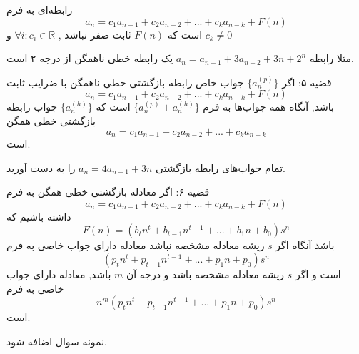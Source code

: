 \begin{DEFINITION}
    رابطه‌ای به فرم
   \[a_n=c_{1}a_{n-1}+c_{2}a_{n-2}+...+c_{k}a_{n-k}+F(n)\]
   است که
   $F(n)$
   ثابت صفر نباشد
   ,
   $\forall{i}:c_i \in \mathbb{R} $
   و 
   $ c_k\neq 0$

\end{DEFINITION}

مثلا رابطه‌ 
$a_n=a_{n-1}+3a_{n-2}+3n+2^n$
یک رابطه‌ خطی ناهمگن از درجه ۲ است.

\begin{THEOREM}
    قضیه ۵:
    اگر 
    $\{a^{(p)}_n\}$
    جواب خاص رابطه‌ بازگشتی خطی ناهمگن با ضرایب ثابت
    \[a_n=c_{1}a_{n-1}+c_{2}a_{n-2}+...+c_{k}a_{n-k}+F(n)\]
    باشد,
    آنگاه همه جواب‌ها به فرم 
    $\{a^{(p)}_n+a^{(h)}_n\}$
    است که
    $\{a^{(h)}_n\}$
    جواب رابطه‌ بازگشتی خطی همگن
    \[a_n=c_{1}a_{n-1}+c_{2}a_{n-2}+...+c_{k}a_{n-k}\]
    است.
\end{THEOREM}

\begin{PROBLEM}
    تمام جواب‌های رابطه‌ بازگشتی
    $a_n=4a_{n-1}+3n$
    را به دست آورید.
\end{PROBLEM}

\begin{THEOREM}
    قضیه ۶:
    اگر معادله بازگشتی خطی همگن به فرم
    \[a_n=c_{1}a_{n-1}+c_{2}a_{n-2}+...+c_{k}a_{n-k}+F(n)\]
    داشته باشیم که
    \[F(n)=(b_tn^t+b_{t-1}n^{t-1}+...+b_1n+b_0)s^n\]
    باشذ آنگاه اگر 
    $s$
    ریشه معادله مشخصه نباشد معادله دارای جواب خاصی به فرم
    \[(p_tn^t+p_{t-1}n^{t-1}+...+p_1n+p_0)s^n\]
    است و اگر
    $s$
    ریشه معادله مشخصه باشد و درجه آن 
    $m$
    باشد, معادله دارای جواب خاصی به فرم
    \[n^m(p_tn^t+p_{t-1}n^{t-1}+...+p_1n+p_0)s^n\]
    است.
\end{THEOREM}

\begin{PROBLEM}
    نمونه سوال اضافه شود.
\end{PROBLEM}